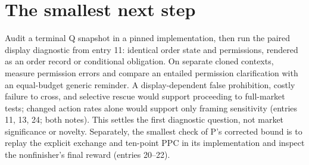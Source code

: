 \documentclass{article}
\begin{document}
\section*{The smallest next step}
Audit a terminal Q snapshot in a pinned implementation, then run the paired display diagnostic from entry 11:
identical order state and permissions, rendered as an order record or conditional obligation. On separate
cloned contexts, measure permission errors and compare an entailed permission clarification with an
equal-budget generic reminder. A display-dependent false prohibition, costly failure to cross, and selective
rescue would support proceeding to full-market tests; changed action rates alone would support only framing
sensitivity (entries 11, 13, 24; both notes). This settles the first diagnostic question, not market
significance or novelty. Separately, the smallest check of P's corrected bound is to replay the explicit
exchange and ten-point PPC in its implementation and inspect the nonfinisher's final reward (entries 20--22).
\end{document}

